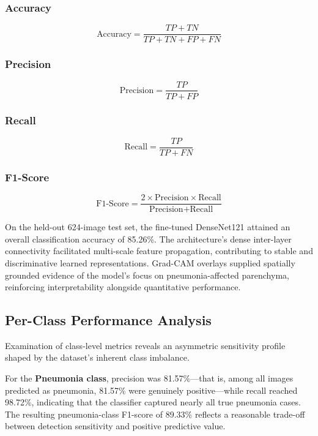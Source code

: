 \documentclass[conference]{IEEEtran}
\begin{document}
\subsubsection{Accuracy}
\begin{equation}
\text{Accuracy} = \frac{TP + TN}{TP + TN + FP + FN}
\end{equation}

\subsubsection{Precision}
\begin{equation}
\text{Precision} = \frac{TP}{TP + FP}
\end{equation}

\subsubsection{Recall}
\begin{equation}
\text{Recall} = \frac{TP}{TP + FN}
\end{equation}

\subsubsection{F1-Score}
\begin{equation}
\text{F1-Score} = \frac{2 \times \text{Precision} \times \text{Recall}}{\text{Precision} + \text{Recall}}
\end{equation}

On the held-out 624-image test set, the fine-tuned DenseNet121 attained an overall classification accuracy of 85.26\%. The architecture's dense inter-layer connectivity facilitated multi-scale feature propagation, contributing to stable and discriminative learned representations. Grad-CAM overlays supplied spatially grounded evidence of the model's focus on pneumonia-affected parenchyma, reinforcing interpretability alongside quantitative performance.

\subsection{Per-Class Performance Analysis}
Examination of class-level metrics reveals an asymmetric sensitivity profile shaped by the dataset's inherent class imbalance.

For the \textbf{Pneumonia class}, precision was 81.57\%---that is, among all images predicted as pneumonia, 81.57\% were genuinely positive---while recall reached 98.72\%, indicating that the classifier captured nearly all true pneumonia cases. The resulting pneumonia-class F1-score of 89.33\% reflects a reasonable trade-off between detection sensitivity and positive predictive value.
\end{document}
